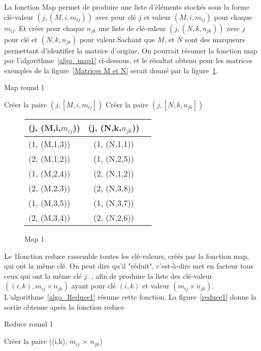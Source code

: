 La fonction Map permet de produire une liste d'éléments stockés sous la forme clé-valeur $ (j,(M,i,m_{ij}))$ avec pour clé $j$ et valeur $ (M,i,m_{ij})$ pour chaque $m_{ij}$.
Et créer pour chaque $n_{jk}$ une liste de clé-valeur $(j,(N,k,n_{jk}))$ avec $j$ pour clé et $(N,k,n_{jk})$ pour valeur.Sachant que $M$, et $N$  sont des marqueurs permettant
d'identifier la matrice d'origine. On pourrait résumer la fonction map par l'algorithme~\ref{algo_map1} ci-dessous, et le résultat obtenu pour les matrices exemples de la figure~\ref{Matrices M et N} 
serait donné par la figure~\ref{map1}.
\begin{algorithm}
  \caption{Map round 1}
  \label{algo_map1}
  \begin{algorithmic}
    \State Créer la paire $(j,[M,i,m_{ij}])$
    \EndFor
    \State Créer la paire $(j,[N,k,n_{jk}])$
    \EndFor
  \end{algorithmic}
\end{algorithm}
\begin{figure}[H]
  \begin{center}
    \begin{tabular}{|l|c|r|} \hline (j, (M,i,$m_{ij}$)) & (j, (N,k,$n_{jk}$)) \\ \hline (1, (M,1,3)) & (1, (N,1,1)) \\(2, (M,1,2)) & (1, (N,2,5))\\(1, (M,2,4)) &(2, (N,1,2))  \\(2, (M,2,3)) & (2, (N,3,8)) \\(1, (M,3,5))  & (1, (N,3,7)) \\(2, (M,3,4)) & (2, (N,2,6)) \\ \hline
    \end{tabular}
    \caption{Map 1}
    \label{map1}
  \end{center}
\end{figure} 
\littlesectionspace
Le 1\iere fonction reduce rassemble toutes les clé-valeurs, créés par la fonction map, qui ont la même clé. On peut dire qu'il "réduit", c'est-à-dire met en facteur tous ceux qui ont la même clé $j$.
, afin de produire la liste des clé-valeur $((i,k), m_{ij} \times n_{jk})$ ayant pour clé $(i,k)$ et valeur $( m_{ij} \times n_{jk})$. L'algorithme~\ref{algo_Reduce1} résume cette fonction. La figure~\ref{reduce1} donne la sortie obtenue après la fonction reduce
\begin{algorithm}[H]
  \caption{Reduce round 1}
  \label{algo_Reduce1}
  \begin{algorithmic}
    \State Cr\'{e}er la paire ((i,k), $m_{ij}$ $\times$ $n_{jk}$)
    \EndFor
  \end{algorithmic}
\end{algorithm}

